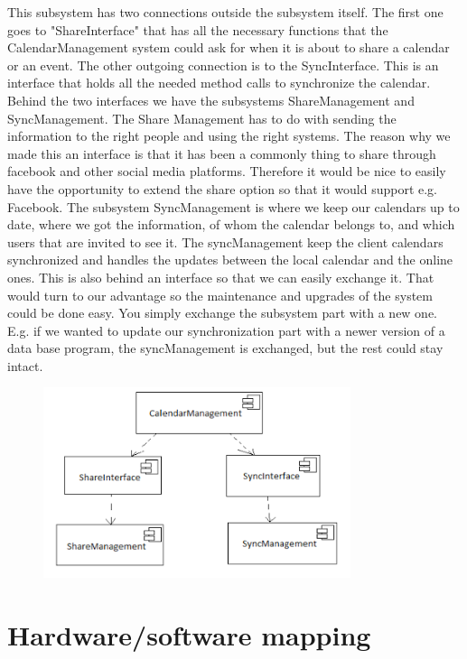This subsystem has two connections outside the subsystem itself. The first one goes to "ShareInterface" that has all the necessary functions that the CalendarManagement system could ask for when it is about to share a calendar or an event. The other outgoing connection is to the SyncInterface. This is an interface that holds all the needed method calls to synchronize the calendar. Behind the two interfaces we have the subsystems ShareManagement and SyncManagement. 
\newline
\newline
The Share Management has to do with sending the information to the right people and using the right systems. The reason why we made this an interface is that it has been a commonly thing to share through facebook and other social media platforms. Therefore it would be nice to easily have the opportunity to extend the share option so that it would support e.g. Facebook. 
\newline
\newline
The subsystem SyncManagement is where we keep our calendars up to date, where we got the information, of whom the calendar belongs to, and which users that are invited to see it. The syncManagement keep the client calendars synchronized and handles the updates between the local calendar and the online ones. This is also behind an interface so that we can easily exchange it. That would turn to our advantage so the maintenance and upgrades of the system could be done easy. You simply exchange the subsystem part with a new one. E.g. if we wanted to update our synchronization part with a newer version of a data base program, the syncManagement is exchanged, but the rest could stay intact. 
\newline
\begin{figure}[ht!]
\centering
\includegraphics[width=90mm]{diagram.png}
\end{figure}


\newpage
\section*{Hardware/software mapping}


